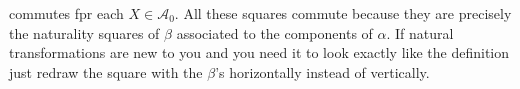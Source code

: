 \documentclass[11pt]{amsart}
\theoremstyle{plain}
\theoremstyle{definition}
\newcommand{\cA}{{\mathcal A}}
\newcommand{\cC}{{\mathcal C}}
\newcommand{\Set}{{\mathbf{Set}}}
\newcommand{\Ab}{\mathbf{Ab}}
\newcommand{\noi}{{\noindent}}
\begin{document}
\noi commutes fpr each $X \in \cA_0$. All these squares commute because they are precisely the naturality squares of $\beta$ associated to the components of $\alpha$. If natural transformations are new to you and you need it to look exactly like the definition just redraw the square with the $\beta$'s horizontally instead of vertically.


\begin{comment}


\subsection{Yoneda's Lemma}

Categories are contexts for mathematical objects we care about that allow us to study them in terms of the morphisms between them. For example, sets are determined by their elements and one way to study a set, $S$, is to view it as an object in the category $\Set$, and then look at the functions 

\[ \{ * \} \to S  \]

\noi corresponding to the elements of $S$. This is a special example where it suffices to look at one kind of arrow in the category but it doesn't always work, for example in the category of abelian groups (and group homomorphisms) $\Ab$ the only such group homomorphism is $0$. \medskip 

When every map can be described in terms of\footnote[1]{I'm being vague, we haven't talked about limits/colimits yet. The category $\Set$ is completely determined by coproducts of its terminal object. I think this is called being well-copowered and being well-powered is the dual concept (with initial object and products)} maps out of the terminal object we can call these maps \textbf{elements}. If we can't do that, no problem, we just take all the maps with a common codomain and call them \textbf{generalized elements} (of their codomain). Think: 

\[ \left( X \to Y \in \cC \right) \quad  \rightsquigarrow \quad \text{ "An $X$-shaped thing in $Y$"} \]

\noi The collection of all these different shapes of things in $Y$ are the its generalized elements and they're encoded in the contravariant hom-functor 

\[ \cC(-,Y) : \cC^{op} \to \Set .\]

\noi Functors $F: \cC^{op} \to \Set$ are often called \textit{presheaves} and for each $X \in \cC_0$ the set $F(X)$ is often called the (set of) \textit{local sections} of $F$ at $X$. The hom-functors are special presheaves that represent the objects of $\cC$ in the category of presheaves on $\cC$ and people sometimes call them (the) \textit{representable(s)}~\footnote[2]{This is somewhat abusive: Representable functors are functors that are isomorphic to the hom-functors and that isomorphism is called a representation. One thinks of the object in $\cC$ as representing the functor in that case.}. It's straightforward to check that assigning each object in $\cC$ to its representable presheaf is itself a functor:


\end{comment}
\end{document}
